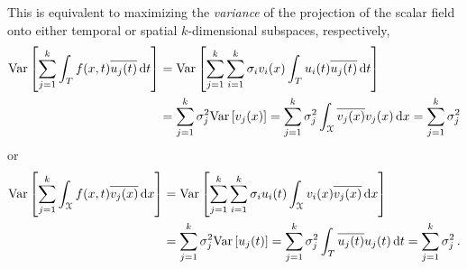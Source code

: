 \documentclass[10pt]{article}
\newcommand{\norm}[1]{\left\Vert#1\right\Vert}
\begin{document}
This is equivalent to maximizing the {\em variance} of the projection of the scalar field onto either temporal or spatial $k$-dimensional subspaces, respectively,
\begin{equation}
\begin{aligned}
\mathrm{Var} \left[
\sum_{j=1}^k 
\int_T  f({x},t) \overline{u_j(t)}\,\mathrm{d}t\right] &= \mathrm{Var}\left[\sum_{j=1}^k \sum_{i=1}^{k} \sigma_{i} v_i(x) 
\int_T u_i(t)\overline{u_j(t)}\,\mathrm{d}t
\right] \\
&= \sum_{j=1}^{k} \sigma_{j}^2 \mathrm{Var}\left[v_j(x)
\right] = \sum_{j=1}^{k} \sigma_{j}^2 
\int_{\cal X} \overline{ v_j(x) }v_j(x)
\,\mathrm{d} x = \sum_{j=1}^{k} \sigma_{j}^2 
\end{aligned}
\end{equation}
or
\begin{equation}
\begin{aligned}
\mathrm{Var}\left[
\sum_{j=1}^k 
\int_{\cal X} f({x},t) \overline{v_j(x)}\,\mathrm{d}x \right] &= \mathrm{Var} \left[\sum_{j=1}^k \sum_{i=1}^{k} \sigma_{i} 
u_i(t)  
\int_{\cal X} v_i(x)\overline{v_j(x)} \,\mathrm{d}x
\right] \\
&= \sum_{j=1}^{k} \sigma_{j}^2 \mathrm{Var}
\left[ u_j(t) \right] = \sum_{j=1}^{k} \sigma_{j}^2 
\int_T \overline{ u_j(t) }u_j(t)
\,\mathrm{d} t= \sum_{j=1}^{k} \sigma_{j}^2 \,.
\end{aligned}
\end{equation}
\end{document}
